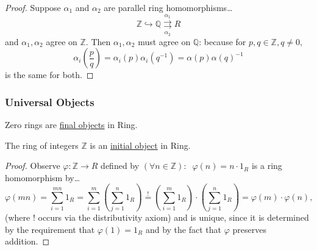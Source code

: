 \begin{proof}
Suppose $\alpha_1$ and $\alpha_2$ are parallel ring homomorphisms\dots
$$\mathbb{Z} \hookrightarrow \mathbb{Q} \underset{\alpha_2}{\overset{\alpha_1}{\rightrightarrows}} R$$
and $\alpha_1, \alpha_2$ agree on $\mathbb{Z}$. Then $\alpha_1, \alpha_2$ must agree on $\mathbb{Q}$: because
for $p,q \in \mathbb{Z}, q \neq 0,$
$$\alpha_i\left(\frac{p}{q}\right) = \alpha_i(p)\alpha_i(q^{-1})=\alpha(p)\alpha(q)^{-1}$$
is the same for both.
\end{proof}

\subsubsection{Universal Objects}

\begin{proposition}
Zero rings are \hyperref[final]{final objects} in Ring.
\end{proposition}

\begin{proposition}
The ring of integers $\mathbb{Z}$ is an \hyperref[final]{initial object} in Ring.
\end{proposition}

\begin{proof}
Observe $\varphi : \mathbb{Z} \rightarrow R$ defined by $(\forall n \in \mathbb{Z}): \; \; \varphi(n) = n \cdot 1_R$ is a
ring homomorphism by\dots
$$\varphi(mn) = \sum^{mn}_{i=1} 1_R = \sum^{m}_{i=1}(\sum^{n}_{j=1} 1_R) \overset{!}{=} (\sum^{m}_{i=1} 1_R) \cdot (\sum^{n}_{j=1} 1_R) = \varphi(m) \cdot \varphi(n),$$
(where $!$ occurs via the distributivity axiom) and is unique, since it is determined by the requirement that $\varphi(1) = 1_R$ and by the fact that $\varphi$ preserves addition. 
\end{proof}